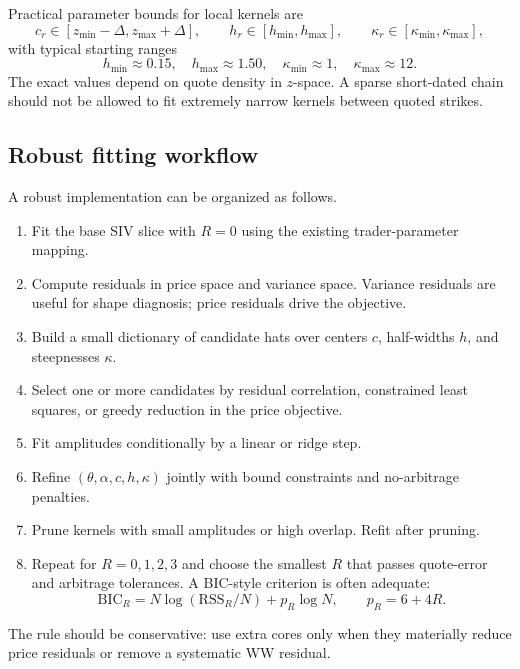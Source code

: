 \documentclass[11pt]{article}
\begin{document}
Practical parameter bounds for local kernels are
\begin{equation}
  c_r\in[z_{\min}-\Delta,z_{\max}+\Delta],
  \qquad
  h_r\in[h_{\min},h_{\max}],
  \qquad
  \kappa_r\in[\kappa_{\min},\kappa_{\max}],
  \label{eq:kernel-bounds}
\end{equation}
with typical starting ranges
\begin{equation}
  h_{\min}\approx0.15,
  \quad
  h_{\max}\approx1.50,
  \quad
  \kappa_{\min}\approx1,
  \quad
  \kappa_{\max}\approx12.
\end{equation}
The exact values depend on quote density in $z$-space.  A sparse short-dated chain should not be allowed to fit extremely narrow kernels between quoted strikes.

\subsection{Robust fitting workflow}

A robust implementation can be organized as follows.
\begin{enumerate}[leftmargin=2em]
  \item Fit the base SIV slice with $R=0$ using the existing trader-parameter mapping.
  \item Compute residuals in price space and variance space.  Variance residuals are useful for shape diagnosis; price residuals drive the objective.
  \item Build a small dictionary of candidate hats over centers $c$, half-widths $h$, and steepnesses $\kappa$.
  \item Select one or more candidates by residual correlation, constrained least squares, or greedy reduction in the price objective.
  \item Fit amplitudes conditionally by a linear or ridge step.
  \item Refine $(\theta,\alpha,c,h,\kappa)$ jointly with bound constraints and no-arbitrage penalties.
  \item Prune kernels with small amplitudes or high overlap.  Refit after pruning.
  \item Repeat for $R=0,1,2,3$ and choose the smallest $R$ that passes quote-error and arbitrage tolerances.  A BIC-style criterion is often adequate:
  \begin{equation}
    \mathrm{BIC}_R=N\log(\mathrm{RSS}_R/N)+p_R\log N,
    \qquad p_R=6+4R.
  \end{equation}
\end{enumerate}
The rule should be conservative: use extra cores only when they materially reduce price residuals or remove a systematic WW residual.
\end{document}
